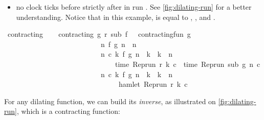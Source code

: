 \begin{isabellebody}
\begin{isamarkuptext}
\begin{itemize}
\begin{itemize}
\item no clock ticks before  strictly after  
in run .
See \autoref{fig:dilating-run} for a better understanding. Notice that in this 
example,  is equal to , , 
and . %
\end{itemize}%
\end{itemize}%
\end{isamarkuptext}\isamarkuptrue%
\isanewline
{}\isamarkupfalse%
\ contracting\isanewline
{}\ \isanewline
\ \ {\isacartoucheopen}contracting\ g\ r\ sub\ f\ {\isasymequiv}\ \ contracting{\isacharunderscore}fun\ g\isanewline
\ \ \ \ \ \ \ \ \ \ \ \ \ \ \ \ \ \ \ \ \ \ \ \ \ \ {\isasymand}\ {\isacharparenleft}{\isasymforall}n{\isachardot}\ f\ {\isacharparenleft}g\ n{\isacharparenright}\ {\isasymle}\ n{\isacharparenright}\isanewline
\ \ \ \ \ \ \ \ \ \ \ \ \ \ \ \ \ \ \ \ \ \ \ \ \ \ {\isasymand}\ {\isacharparenleft}{\isasymforall}n\ c\ k{\isachardot}\ f\ {\isacharparenleft}g\ n{\isacharparenright}\ {\isasymle}\ k\ {\isasymand}\ k\ {\isasymle}\ n\isanewline
\ \ \ \ \ \ \ \ \ \ \ \ \ \ \ \ \ \ \ \ \ \ \ \ \ \ \ \ \ \ {\isasymlongrightarrow}\ time\ {\isacharparenleft}{\isacharparenleft}Rep{\isacharunderscore}run\ r{\isacharparenright}\ k\ c{\isacharparenright}\ {\isacharequal}\ time\ {\isacharparenleft}{\isacharparenleft}Rep{\isacharunderscore}run\ sub{\isacharparenright}\ {\isacharparenleft}g\ n{\isacharparenright}\ c{\isacharparenright}{\isacharparenright}\isanewline
\ \ \ \ \ \ \ \ \ \ \ \ \ \ \ \ \ \ \ \ \ \ \ \ \ \ {\isasymand}\ {\isacharparenleft}{\isasymforall}n\ c\ k{\isachardot}\ f\ {\isacharparenleft}g\ n{\isacharparenright}\ {\isacharless}\ k\ {\isasymand}\ k\ {\isasymle}\ n\isanewline
\ \ \ \ \ \ \ \ \ \ \ \ \ \ \ \ \ \ \ \ \ \ \ \ \ \ \ \ \ \ {\isasymlongrightarrow}\ {\isasymnot}\ hamlet\ {\isacharparenleft}{\isacharparenleft}Rep{\isacharunderscore}run\ r{\isacharparenright}\ k\ c{\isacharparenright}{\isacharparenright}{\isacartoucheclose}%
\begin{isamarkuptext}%
For any dilating function, we can build its \emph{inverse}, as illustrated on
  \autoref{fig:dilating-run}, which is a contracting function:%
\end{isamarkuptext}\isamarkuptrue%
\isamarkupfalse%

\end{isabellebody}
